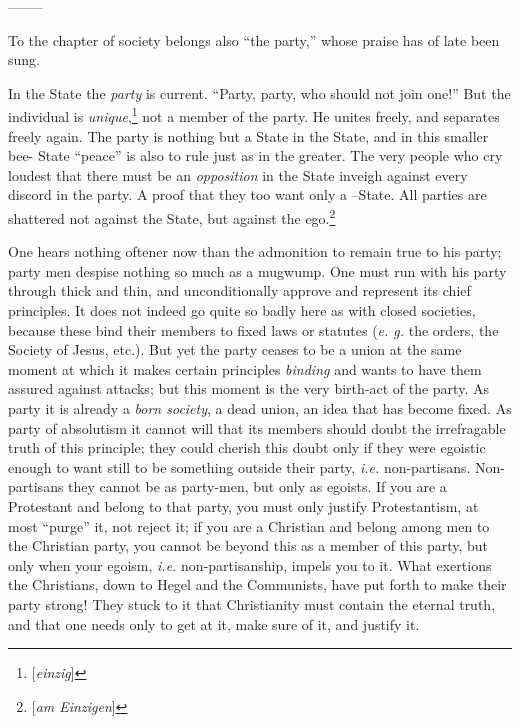 \documentclass[12pt,a4paper]{book}
\begin{document}
\begin{center}
--------\end{center}


To the chapter of society belongs also ``the party,'' whose praise has of 
late been sung.

In the State the \textit{party} is current. ``Party, party, who should not 
join one!'' But the individual is 
\textit{unique},\footnote{[\textit{einzig}]} not a member of the party. He 
unites freely, and separates freely again. The party is nothing but a State in 
the State, and in this smaller bee- State ``peace'' is also to rule just as 
in the greater. The very people who cry loudest that there must be an 
\textit{opposition} in the State inveigh against every discord in the party. A 
proof that they too want only a --State. All parties are shattered not against 
the State, but against the ego.\footnote{[\textit{am Einzigen}]}

One hears nothing oftener now than the admonition to remain true to his party; 
party men despise nothing so much as a mugwump. One must run with his party 
through thick and thin, and unconditionally approve and represent its chief 
principles. It does not indeed go quite so badly here as with closed 
societies, because these bind their members to fixed laws or statutes 
(\textit{e. g.} the orders, the Society of Jesus, etc.). But yet the party 
ceases to be a union at the same moment at which it makes certain principles 
\textit{binding} and wants to have them assured against attacks; but this 
moment is the very birth-act of the party. As party it is already a 
\textit{born society}, a dead union, an idea that has become fixed. As party 
of absolutism it cannot will that its members should doubt the irrefragable 
truth of this principle; they could cherish this doubt only if they were 
egoistic enough to want still to be something outside their party, 
\textit{i.e.} non-partisans. Non-partisans they cannot be as party-men, but 
only as egoists. If you are a Protestant and belong to that party, you must 
only justify Protestantism, at most ``purge'' it, not reject it; if you are 
a Christian and belong among men to the Christian party, you cannot be beyond 
this as a member of this party, but only when your egoism, \textit{i.e.} 
non-partisanship, impels you to it. What exertions the Christians, down to 
Hegel and the Communists, have put forth to make their party strong! They 
stuck to it that Christianity must contain the eternal truth, and that one 
needs only to get at it, make sure of it, and justify it.
\end{document}
